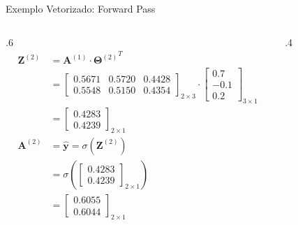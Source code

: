 \documentclass[aspectratio=169, xcolor=dvipsnames]{beamer}
\begin{document}
\begin{frame}{Exemplo Vetorizado: Forward Pass}
    \begin{columns}
        \begin{column}{.6\linewidth}
        \small
        \begin{align*}
      \mathbf{Z}^{(2)}&= \mathbf{A}^{(1)}\cdot{\mathbf{\Theta}^{(2)}}^{T}\\
      &=\begin{bmatrix}
        0.5671 & 0.5720 & 0.4428 \\
        0.5548 & 0.5150 & 0.4354
      \end{bmatrix}_{2\times3}\cdot
      \begin{bmatrix}
        0.7  \\
        -0.1 \\
        0.2
      \end{bmatrix}_{3\times1}\\
      &=
      \begin{bmatrix}
        0.4283 \\
        0.4239
      \end{bmatrix}_{2\times1}\\
      \mathbf{A}^{(2)}&= \hat{\mathbf{y}}= \sigma(\mathbf{Z}^{(2)})\\
      &= \sigma\left(\begin{bmatrix}
        0.4283 \\
        0.4239
      \end{bmatrix}_{2\times1}\right)\\
      &=\begin{bmatrix}
        0.6055 \\
        0.6044
      \end{bmatrix}_{2\times1}
        \end{align*}                
        \end{column}
        \begin{column}{.4\textwidth}
            \begin{figure}
                \centering
                \resizebox{\linewidth}{!}{
                }
            \end{figure}
        \end{column}    
    \end{columns}
\end{frame}
\end{document}
